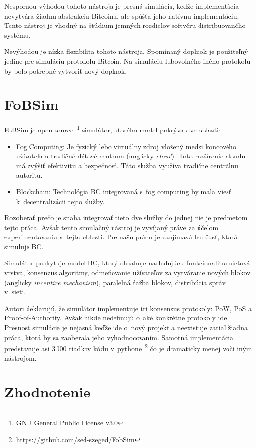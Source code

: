 Nespornou výhodou tohoto nástroja je presná simulácia, keďže implementácia nevytvára žiadnu abstrakciu Bitcoinu, ale spúšťa jeho natívnu implementáciu. Tento nástroj je vhodný na štúdium jemných rozdielov softvéru distribuovaného systému.

Nevýhodou je nízka flexibilita tohoto nástroja. Spomínaný doplnok je použiteľný jedine pre simuláciu protokolu Bitcoin. Na simuláciu ľubovoľného iného protokolu by bolo potrebné vytvoriť nový doplnok.~\cite{shadowBitcoin}

\section{FoBSim}

FoBSim je open source~\footnote{GNU General Public License v3.0} simulátor, ktorého model pokrýva dve oblasti:
\begin{itemize}
	\item Fog Computing: Je fyzický lebo virtuálny zdroj vložený medzi koncového užívateľa a tradičné dátové centrum (anglicky \textit{cloud}). Toto rozšírenie cloudu má zvýšiť efektivitu a bezpečnosť. Táto služba využíva tradične centrálnu autoritu.
	\item Blockchain: Technológia BC integrovaná s~fog computing by mala viesť k~decentralizácii tejto služby.
\end{itemize}
Rozoberať prečo je snaha integrovať tieto dve služby do jednej nie je predmetom tejto práca. Avšak tento simulačný nástroj je vyvíjaný práve za účelom experimentovania v~tejto oblasti. Pre našu prácu je zaujímavá len časť, ktorá simuluje BC.

Simulátor poskytuje model BC, ktorý obsahuje nasledujúcu funkcionalitu: sieťová vrstva, konsenzus algoritmy, odmeňovanie užívateľov za vytváranie nových blokov (anglicky \textit{incentive mechanism}), paralelná ťažba blokov, distribúcia správ v~sieti.~\cite{fobsimWp}

Autori deklarujú, že simulátor implementuje tri konsenzus protokoly: PoW, PoS a Proof-of-Authority. Avšak nikde nedefinujú o~aké konkrétne protokoly ide. Presnosť simulácie je nejasná keďže ide o~nový projekt a neexistuje zatiaľ žiadna práca, ktorá by sa zaoberala jeho vyhodnocovaním. Samotná implementácia predstavuje asi 3\,000 riadkov kódu v~pythone~\footnote{\url{https://github.com/sed-szeged/FobSim}} čo je dramaticky menej voči iným nástrojom. 

\section{Zhodnotenie}

